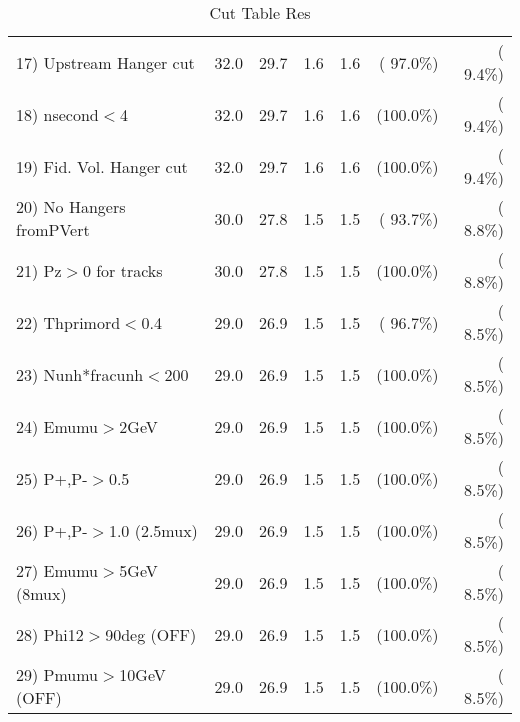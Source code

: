 \begin{table}[h!]
\begin{tabular}{||l||r|r|r|r|r|r||}
 17) Upstream Hanger cut  &         32.0 &         29.7 &          1.6 &          1.6 & ( 97.0\%) & (  9.4\%) \\
 18) nsecond$<$4          &         32.0 &         29.7 &          1.6 &          1.6 & (100.0\%) & (  9.4\%) \\
 19) Fid. Vol. Hanger cut &         32.0 &         29.7 &          1.6 &          1.6 & (100.0\%) & (  9.4\%) \\
 20) No Hangers fromPVert &         30.0 &         27.8 &          1.5 &          1.5 & ( 93.7\%) & (  8.8\%) \\
 21) Pz$>$0 for tracks    &         30.0 &         27.8 &          1.5 &          1.5 & (100.0\%) & (  8.8\%) \\
 22) Thprimord$<$0.4      &         29.0 &         26.9 &          1.5 &          1.5 & ( 96.7\%) & (  8.5\%) \\
 23) Nunh*fracunh$<$200   &         29.0 &         26.9 &          1.5 &          1.5 & (100.0\%) & (  8.5\%) \\
 24) Emumu$>$2GeV         &         29.0 &         26.9 &          1.5 &          1.5 & (100.0\%) & (  8.5\%) \\
 25) P+,P-$>$0.5          &         29.0 &         26.9 &          1.5 &          1.5 & (100.0\%) & (  8.5\%) \\
 26) P+,P-$>$1.0 (2.5mux) &         29.0 &         26.9 &          1.5 &          1.5 & (100.0\%) & (  8.5\%) \\
 27) Emumu$>$5GeV  (8mux) &         29.0 &         26.9 &          1.5 &          1.5 & (100.0\%) & (  8.5\%) \\
 28) Phi12$>$90deg  (OFF) &         29.0 &         26.9 &          1.5 &          1.5 & (100.0\%) & (  8.5\%) \\
 29) Pmumu$>$10GeV  (OFF) &         29.0 &         26.9 &          1.5 &          1.5 & (100.0\%) & (  8.5\%) \\
 \hline
 \hline
 \end{tabular}
 \caption{Cut Table  Res      }
 \label{tab-cutcohjpsi-mumu_res}
 \end{table}
